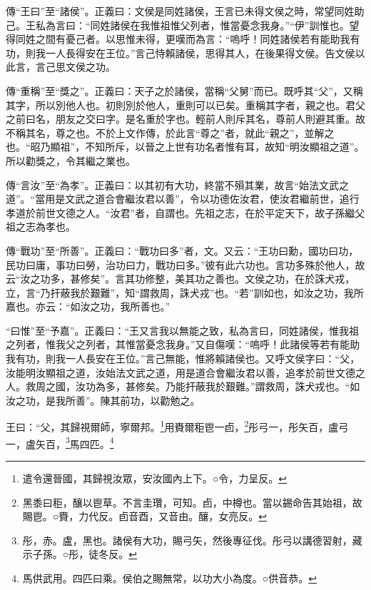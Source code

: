 {\noindent\zhuan{}\fzbyks 傳“王曰”至“諸侯”。正義曰：文侯是同姓諸侯，王言已未得文侯之時，常望同姓助己。王私為言曰：“同姓諸侯在我惟祖惟父列者，惟當憂念我身。”“伊”訓惟也。望得同姓之間有憂己者。以思惟未得，更嘆而為言：“嗚呼！同姓諸侯若有能助我有功，則我一人長得安在王位。”言己恃賴諸侯，思得其人，在後果得文侯。告文侯以此言，言己思文侯之功。 \par}

{\noindent\zhuan{}\fzbyks 傳“重稱”至“獎之”。正義曰：天子之於諸侯，當稱“父舅”而已。既呼其“父”，又稱其字，所以別他人也。初則別於他人，重則可以已矣。重稱其字者，親之也。君父之前曰名，朋友之交曰字。是名重於字也。輕前人則斥其名，尊前人則避其重。故不稱其名，尊之也。不於上文作傳，於此言“尊之”者，就此“親之”，並解之也。“昭乃顯祖”，不知所斥，以晉之上世有功名者惟有耳，故知“明汝顯祖之道”。所以勸獎之，令其繼之業也。 \par}

{\noindent\zhuan{}\fzbyks 傳“言汝”至“為孝”。正義曰：以其初有大功，終當不殞其業，故言“始法文武之道”。“當用是文武之道合會繼汝君以善”，令以功德佐汝君，使汝君繼前世，追行孝道於前世文德之人。“汝君”者，自謂也。先祖之志，在於平定天下，故子孫繼父祖之志為孝也。 \par}

{\noindent\zhuan{}\fzbyks 傳“戰功”至“所善”。正義曰：“戰功曰多”者，文。又云：“王功曰勳，國功曰功，民功曰庸，事功曰勞，治功曰力，戰功曰多。”彼有此六功也。言功多殊於他人，故云“汝之功多，甚修矣”。言其功修整，美其功之善也。文侯之功，在於誅犬戎，立，言“乃扞蔽我於艱難”，知“謂救周，誅犬戎”也。“若”訓如也，如汝之功，我所嘉也。亦云：“如汝之功，我所善也。” \par}

{\noindent\shu{}\fzkt “曰惟”至“予嘉”。正義曰：“王又言我以無能之致，私為言曰，同姓諸侯，惟我祖之列者，惟我父之列者，其惟當憂念我身。”又自傷嘆：“嗚呼！此諸侯等若有能助我有功，則我一人長安在王位。”言己無能，惟將賴諸侯也。又呼文侯字曰：“父，汝能明汝顯祖之道，汝始法文武之道，用是道合會繼汝君以善，追孝於前世文德之人。救周之國，汝功為多，甚修矣。乃能扞蔽我於艱難。”謂救周，誅犬戎也。“如汝之功，是我所善”。陳其前功，以勸勉之。 \par}

王曰：“父，其歸視爾師，寧爾邦。\footnote{遣令還晉國，其歸視汝眾，安汝國內上下。○令，力呈反。}用賚爾秬鬯一卣，\footnote{黑黍曰秬，釀以鬯草。不言圭瓚，可知。卣，中樽也。當以錫命告其始祖，故賜鬯。○賚，力代反。卣音酉，又音由。釀，女亮反。}彤弓一，彤矢百，盧弓一，盧矢百，\footnote{彤，赤。盧，黑也。諸侯有大功，賜弓矢，然後專征伐。彤弓以講德習射，藏示子孫。○彤，徒冬反。}馬四匹。\footnote{馬供武用。四匹曰乘。侯伯之賜無常，以功大小為度。○供音恭。}



